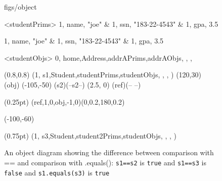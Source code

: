 





\begin {figure}


\Draw

 {figs/object}

\Indirect \Table <studentPrims>
{  
   1, name, "joe" 		&
   1, ssn,  "183-22-4543"		&
   1, gpa,  3.5			
}

\Indirect {}
{  
   1, name, "joe" 		&
   1, ssn,  "183-22-4543"		&
   1, gpa,  3.5			
}

\Indirect \Table <studentObjs>
 {  0, home,Address,addrAPrims,addrAObjs, , , }
  


\Scale (0.8,0.8)
\Obj (1, s1,Student,studentPrims,studentObjs, , , )
\Move(120,30)
\FcNode(obj)
\Move(-105,-50)
\Node(s2)(--s2--)
\MoveToExit(2.5, 0)
\ORectNode(ref)(-- --)

\PenSize(0.25pt)
\CurvedEdgeAt(ref,1,0,obj,-1,0)(0,0.2,180,0.2)

\Move (-100,-60)

\PenSize(0.75pt)
\Obj (1, s3,Student,student2Prims,studentObjs, , , )



\EndDraw

\caption {An object diagram showing the difference between
comparison with == and comparison with .equals():
\texttt{s1==s2} is \texttt{true} and 
\texttt{s1==s3} is \texttt{false} and 
\texttt{s1.equals(s3)} is \texttt{true}	
}

\label {fig:equals}

\end {figure}


